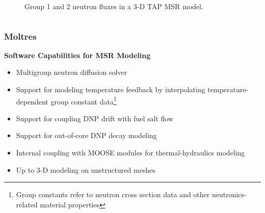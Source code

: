 \begin{frame}
\begin{columns}
\begin{figure}
        \caption{\footnotesize Group 1 and 2 neutron fluxes in a 3-D TAP MSR model.}
      \end{figure}
    \hfill
  \end{columns}
\end{frame}

\begin{frame}
  \frametitle{Moltres}
  \begin{block}{\textbf{Software Capabilities for MSR Modeling}}
    \begin{itemize}
  	  \item Multigroup neutron diffusion solver
      \item Support for modeling temperature feedback by interpolating temperature-dependent group
        constant data\footnote{Group constants refer to neutron cross section data and other
        neutronics-related material properties}
      \item Support for coupling \gls{DNP} drift with fuel salt flow
      \item Support for out-of-core \gls{DNP} decay modeling
      \item Internal coupling with MOOSE modules for thermal-hydraulics modeling
      \item Up to 3-D modeling on unstructured meshes
    \end{itemize}
  \end{block}
\end{frame}

